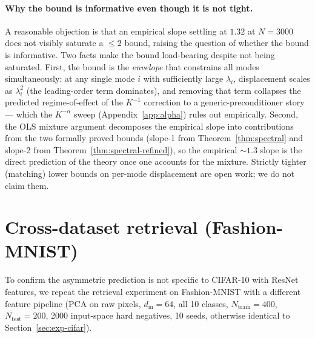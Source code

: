 \documentclass{article}
\begin{document}
\paragraph{Why the bound is informative even though it is not tight.}
A reasonable objection is that an empirical slope settling at $1.32$ at
$N = 3000$ does not visibly saturate a $\leq 2$ bound, raising the
question of whether the bound is informative. Two facts make the bound
load-bearing despite not being saturated. First, the bound is the
\emph{envelope} that constrains all modes simultaneously: at any
single mode $i$ with sufficiently large $\lambda_i$, displacement
scales as $\lambda_i^2$ (the leading-order term dominates), and
removing that term collapses the predicted regime-of-effect of the
$K^{-1}$ correction to a generic-preconditioner story --- which the
$K^{-\alpha}$ sweep (Appendix~\ref{app:alpha}) rules out empirically.
Second, the OLS mixture argument decomposes the empirical slope into
contributions from the two formally proved bounds (slope-1 from
Theorem~\ref{thm:spectral} and slope-2 from
Theorem~\ref{thm:spectral-refined}), so the empirical $\sim 1.3$
slope is the direct prediction of the theory once one accounts for the
mixture. Strictly tighter (matching) lower bounds on per-mode
displacement are open work; we do not claim them.

\section{Cross-dataset retrieval (Fashion-MNIST)}
\label{app:fashion-recall}

To confirm the asymmetric prediction is not specific to CIFAR-10 with
ResNet features, we repeat the retrieval experiment on Fashion-MNIST
with a different feature pipeline (PCA on raw pixels, $d_{\text{in}} =
64$, all 10 classes, $N_{\text{train}} = 400$, $N_{\text{test}} = 200$,
2000 input-space hard negatives, 10 seeds, otherwise identical to
Section~\ref{sec:exp-cifar}).
\end{document}
